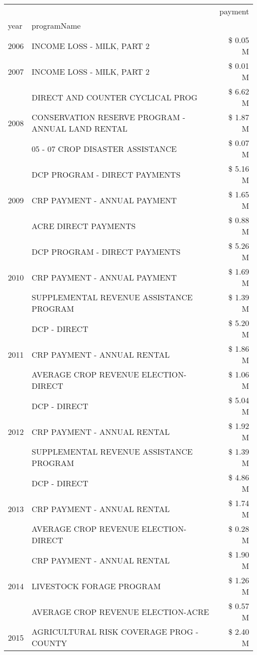 \begin{tabular}{llr}
\toprule
 &  & payment \\
year & programName &  \\
\midrule
2006 & INCOME LOSS - MILK, PART 2 & \$ 0.05 M \\
\cline{1-3}
2007 & INCOME LOSS - MILK, PART 2 & \$ 0.01 M \\
\cline{1-3}
\multirow[t]{3}{*}{2008} & DIRECT AND COUNTER CYCLICAL PROG & \$ 6.62 M \\
 & CONSERVATION RESERVE PROGRAM - ANNUAL LAND RENTAL & \$ 1.87 M \\
 & 05 - 07 CROP DISASTER ASSISTANCE & \$ 0.07 M \\
\cline{1-3}
\multirow[t]{3}{*}{2009} & DCP PROGRAM - DIRECT PAYMENTS & \$ 5.16 M \\
 & CRP PAYMENT - ANNUAL PAYMENT & \$ 1.65 M \\
 & ACRE DIRECT PAYMENTS & \$ 0.88 M \\
\cline{1-3}
\multirow[t]{3}{*}{2010} & DCP PROGRAM - DIRECT PAYMENTS & \$ 5.26 M \\
 & CRP PAYMENT - ANNUAL PAYMENT & \$ 1.69 M \\
 & SUPPLEMENTAL REVENUE ASSISTANCE PROGRAM & \$ 1.39 M \\
\cline{1-3}
\multirow[t]{3}{*}{2011} & DCP - DIRECT & \$ 5.20 M \\
 & CRP PAYMENT - ANNUAL RENTAL & \$ 1.86 M \\
 & AVERAGE CROP REVENUE ELECTION-DIRECT & \$ 1.06 M \\
\cline{1-3}
\multirow[t]{3}{*}{2012} & DCP - DIRECT & \$ 5.04 M \\
 & CRP PAYMENT - ANNUAL RENTAL & \$ 1.92 M \\
 & SUPPLEMENTAL REVENUE ASSISTANCE PROGRAM & \$ 1.39 M \\
\cline{1-3}
\multirow[t]{3}{*}{2013} & DCP - DIRECT & \$ 4.86 M \\
 & CRP PAYMENT - ANNUAL RENTAL & \$ 1.74 M \\
 & AVERAGE CROP REVENUE ELECTION-DIRECT & \$ 0.28 M \\
\cline{1-3}
\multirow[t]{3}{*}{2014} & CRP PAYMENT - ANNUAL RENTAL & \$ 1.90 M \\
 & LIVESTOCK FORAGE PROGRAM & \$ 1.26 M \\
 & AVERAGE CROP REVENUE ELECTION-ACRE & \$ 0.57 M \\
\cline{1-3}
\multirow[t]{3}{*}{2015} & AGRICULTURAL RISK COVERAGE PROG - COUNTY & \$ 2.40 M \\

\end{tabular}
